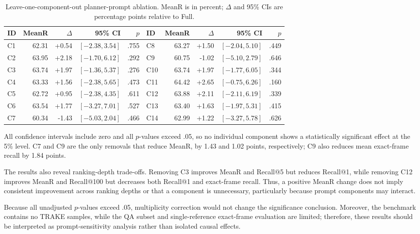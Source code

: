 \documentclass[runningheads]{llncs}
\begin{document}
\begin{table}[t]
\centering
\caption{Leave-one-component-out planner-prompt ablation. MeanR is in percent; $\Delta$ and 95\% CIs are percentage points relative to Full.}
\label{tab:llm-prompt-ablation}
\scriptsize
\setlength{\tabcolsep}{4.8pt}
\renewcommand{\arraystretch}{1.02}
\begin{tabular}{lrrrr@{\hspace{5pt}}lrrrr}
\toprule
\textbf{ID} & \textbf{MeanR} & \textbf{$\Delta$} & \textbf{95\% CI} & \textbf{$p$} &
\textbf{ID} & \textbf{MeanR} & \textbf{$\Delta$} & \textbf{95\% CI} & \textbf{$p$} \\
\midrule
C1 & 62.31 & +0.54 & $[-2.38,3.54]$ & .755 & C8 & 63.27 & +1.50 & $[-2.04,5.10]$ & .449 \\
C2 & 63.95 & +2.18 & $[-1.70,6.12]$ & .292 & C9 & 60.75 & -1.02 & $[-5.10,2.79]$ & .646 \\
C3 & 63.74 & +1.97 & $[-1.36,5.37]$ & .276 & C10 & 63.74 & +1.97 & $[-1.77,6.05]$ & .344 \\
C4 & 63.33 & +1.56 & $[-2.38,5.65]$ & .473 & C11 & 64.42 & +2.65 & $[-0.75,6.26]$ & .160 \\
C5 & 62.72 & +0.95 & $[-2.38,4.35]$ & .611 & C12 & 63.88 & +2.11 & $[-2.11,6.19]$ & .339 \\
C6 & 63.54 & +1.77 & $[-3.27,7.01]$ & .527 & C13 & 63.40 & +1.63 & $[-1.97,5.31]$ & .415 \\
C7 & 60.34 & -1.43 & $[-5.03,2.04]$ & .466 & C14 & 62.99 & +1.22 & $[-3.27,5.78]$ & .626 \\
\bottomrule
\end{tabular}
\end{table}

All confidence intervals include zero and all $p$-values exceed .05, so no individual component shows a statistically significant effect at the 5\% level. C7 and C9 are the only removals that reduce MeanR, by 1.43 and 1.02 points, respectively; C9 also reduces mean exact-frame recall by 1.84 points.

The results also reveal ranking-depth trade-offs. Removing C3 improves MeanR and Recall@5 but reduces Recall@1, while removing C12 improves MeanR and Recall@100 but decreases both Recall@1 and exact-frame recall. Thus, a positive MeanR change does not imply consistent improvement across ranking depths or that a component is unnecessary, particularly because prompt components may interact.

Because all unadjusted $p$-values exceed .05, multiplicity correction would not change the significance conclusion. Moreover, the benchmark contains no TRAKE samples, while the QA subset and single-reference exact-frame evaluation are limited; therefore, these results should be interpreted as prompt-sensitivity analysis rather than isolated causal effects.
\end{document}

